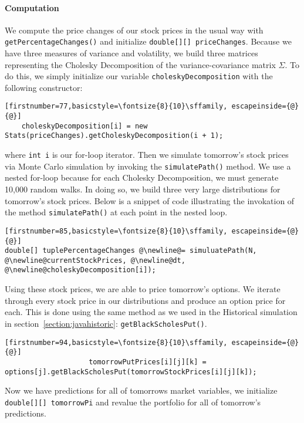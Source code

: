 \documentclass[../Dissertation.tex]{subfiles}
\begin{document}
\iffalse
\paragraph{Computation}

We compute the price changes of our stock prices in the usual way with \lstinline|getPercentageChanges()| and initialize \lstinline|double[][] priceChanges|.
Because we have three measures of variance and volatility, we build three matrices representing the Cholesky Decomposition of the variance-covariance matrix $\Sigma$.
To do this, we simply initialize our variable \lstinline|choleskyDecomposition| with the following constructor:
\begin{lstlisting}[firstnumber=77,basicstyle=\fontsize{8}{10}\sffamily, escapeinside={@}{@}]
	choleskyDecomposition[i] = new Stats(priceChanges).getCholeskyDecomposition(i + 1);
\end{lstlisting}
where \lstinline|int i| is our for-loop iterator.
Then we simulate tomorrow's stock prices via Monte Carlo simulation by invoking the \lstinline|simulatePath()| method.
We use a nested for-loop because for each Cholesky Decomposition, we must generate 10,000 random walks.
In doing so, we build three very large distributions for tomorrow's stock prices.
Below is a snippet of code illustrating the invokation of the method \lstinline|simulatePath()| at each point in the nested loop.
\begin{lstlisting}[firstnumber=85,basicstyle=\fontsize{8}{10}\sffamily, escapeinside={@}{@}]
double[] tuplePercentageChanges @\newline@= simuluatePath(N, @\newline@currentStockPrices, @\newline@dt, @\newline@choleskyDecomposition[i]);
\end{lstlisting}
Using these stock prices, we are able to price tomorrow's options.
We iterate through every stock price in our distributions and produce an option price for each.
This is done using the same method as we used in the Historical simulation in section~\ref{section:javahistoric}: \lstinline|getBlackScholesPut()|.
\begin{lstlisting}[firstnumber=94,basicstyle=\fontsize{8}{10}\sffamily, escapeinside={@}{@}]
                    tomorrowPutPrices[i][j][k] = options[j].getBlackScholesPut(tomorrowStockPrices[i][j][k]);
\end{lstlisting}
Now we have predictions for all of tomorrows market variables, we initialize \lstinline|double[][] tomorrowPi| and revalue the portfolio for all of tomorrow's predictions.
\end{document}
